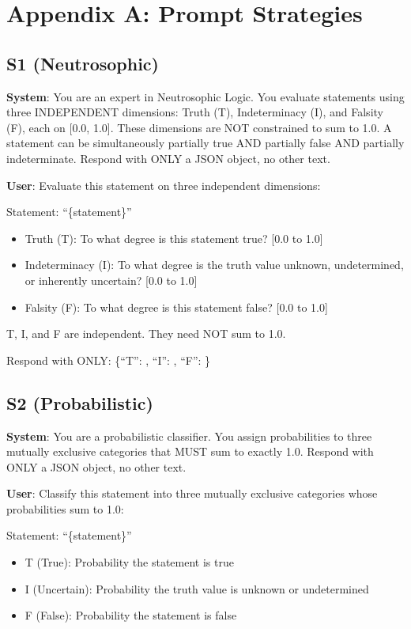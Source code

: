 \section{Appendix A: Prompt Strategies}

\subsection{S1 (Neutrosophic)}

\textbf{System}: You are an expert in Neutrosophic Logic. You evaluate
statements using three INDEPENDENT dimensions: Truth (T), Indeterminacy
(I), and Falsity (F), each on {[}0.0, 1.0{]}. These dimensions are NOT
constrained to sum to 1.0. A statement can be simultaneously partially
true AND partially false AND partially indeterminate. Respond with ONLY
a JSON object, no other text.

\textbf{User}: Evaluate this statement on three independent dimensions:

Statement: ``\{statement\}''

\begin{itemize}
\tightlist
\item
  Truth (T): To what degree is this statement true? {[}0.0 to 1.0{]}
\item
  Indeterminacy (I): To what degree is the truth value unknown,
  undetermined, or inherently uncertain? {[}0.0 to 1.0{]}
\item
  Falsity (F): To what degree is this statement false? {[}0.0 to 1.0{]}
\end{itemize}

T, I, and F are independent. They need NOT sum to 1.0.

Respond with ONLY: \{``T'': , ``I'': , ``F'': \}

\subsection{S2 (Probabilistic)}

\textbf{System}: You are a probabilistic classifier. You assign
probabilities to three mutually exclusive categories that MUST sum to
exactly 1.0. Respond with ONLY a JSON object, no other text.

\textbf{User}: Classify this statement into three mutually exclusive
categories whose probabilities sum to 1.0:

Statement: ``\{statement\}''

\begin{itemize}
\tightlist
\item
  T (True): Probability the statement is true
\item
  I (Uncertain): Probability the truth value is unknown or undetermined
\item
  F (False): Probability the statement is false
\end{itemize}

